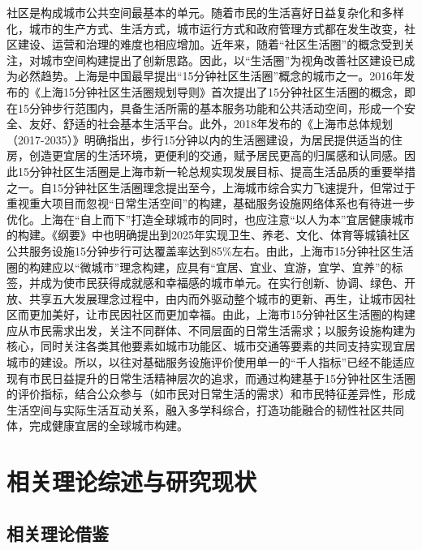 \documentclass{shnuthesis}
\begin{document}
社区是构成城市公共空间最基本的单元。随着市民的生活喜好日益复杂化和多样化，城市的生产方式、生活方式，城市运行方式和政府管理方式都在发生改变，社区建设、运营和治理的难度也相应增加。近年来，随着“社区生活圈”的概念受到关注，对城市空间构建提出了创新思路。因此，以“生活圈”为视角改善社区建设已成为必然趋势。上海是中国最早提出“15分钟社区生活圈”概念的城市之一。2016年发布的《上海15分钟社区生活圈规划导则》首次提出了15分钟社区生活圈的概念，即在15分钟步行范围内，具备生活所需的基本服务功能和公共活动空间，形成一个安全、友好、舒适的社会基本生活平台\textsuperscript{\cite{li2017}}。此外，2018年发布的《上海市总体规划（2017-2035）》明确指出，步行15分钟以内的生活圈建设，为居民提供适当的住房，创造更宜居的生活环境，更便利的交通，赋予居民更高的归属感和认同感\textsuperscript{\cite{ben2018}}。因此15分钟社区生活圈是上海市新一轮总规实现发展目标、提高生活品质的重要举措之一\textsuperscript{\cite{zhou2020}}。自15分钟社区生活圈理念提出至今，上海城市综合实力飞速提升，但常过于重视重大项目而忽视“日常生活空间”的构建\textsuperscript{\cite{zhang2003}}，基础服务设施网络体系也有待进一步优化。上海在“自上而下”打造全球城市的同时，也应注意“以人为本”宜居健康城市的构建。《纲要》中也明确提出到2025年实现卫生、养老、文化、体育等城镇社区公共服务设施15分钟步行可达覆盖率达到85\%左右\textsuperscript{\cite{wu2020}}。由此，上海市15分钟社区生活圈的构建应以“微城市”理念构建，应具有“宜居、宜业、宜游，宜学、宜养”的标签，并成为使市民获得成就感和幸福感的城市单元\textsuperscript{\cite{shanghaishiguihuaheguotuziyuanguanliju2017}}。在实行创新、协调、绿色、开放、共享五大发展理念过程中，由内而外驱动整个城市的更新、再生，让城市因社区而更加美好，让市民因社区而更加幸福。由此，上海市15分钟社区生活圈的构建应从市民需求出发，关注不同群体、不同层面的日常生活需求；以服务设施构建为核心，同时关注各类其他要素如城市功能区、城市交通等要素的共同支持实现宜居城市的建设\textsuperscript{\cite{cheng2018}}。所以，以往对基础服务设施评价使用单一的“千人指标”已经不能适应现有市民日益提升的日常生活精神层次的追求\textsuperscript{\cite{tang2020}}，而通过构建基于15分钟社区生活圈的评价指标，结合公众参与（如市民对日常生活的需求）和市民特征差异性，形成生活空间与实际生活互动关系，融入多学科综合，打造功能融合的韧性社区共同体，完成健康宜居的全球城市构建\textsuperscript{\cite{zhao2020}}。

\section{相关理论综述与研究现状}

\subsection{相关理论借鉴}
\end{document}

